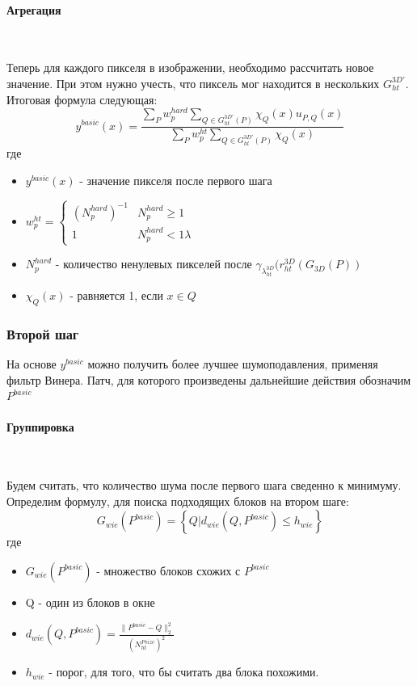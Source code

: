 \paragraph{Агрегация}\

Теперь для каждого пикселя в изображении, необходимо рассчитать новое значение. При этом нужно учесть, что пиксель мог находится в нескольких $G_{ht}^{3D'}$. Итоговая формула следующая:
\begin{equation}
	y^{basic}(x) = \frac{\sum\limits_Pw_p^{hard}\sum\limits_{Q \in G_{ht}^{3D'}(P)}\chi_Q(x)u_{P,Q}(x)}{\sum\limits_Pw_p^{ht}\sum\limits_{Q \in G_{ht}^{3D'}(P)}\chi_Q(x)}
\end{equation}
где
\begin{itemize}
	\item $y^{basic}(x)$ - значение пикселя после первого шага 
	\item $w_p^{ht}  = \begin{cases}(N_p^{hard})^{-1} & N_p^{hard} \geq 1\\ 1 & N_p^{hard} < 1 \lambda\end{cases}$
	\item $N_p^{hard}$ - количество ненулевых пикселей после $\gamma_{\lambda_{ht}^{3D}}(r_{ht}^{3D}(G_{3D}(P))$
	\item $\chi_Q(x)$ - равняется 1, если $x\in Q$
\end{itemize}

\subsubsection{Второй шаг}
На основе $y^{basic}$ можно получить более лучшее шумоподавления, применяя фильтр Винера. Патч, для которого произведены дальнейшие действия обозначим $P^{basic}$
\paragraph{Группировка}\

Будем считать, что количество шума после первого шага сведенно к минимуму. Определим формулу, для поиска подходящих блоков на втором шаге:
\begin{equation}
	G_{wie}(P^{basic}) = \left\{Q | d_{wie}(Q,P^{basic}) \leq h_{wie}\right\}
\end{equation}
где
\begin{itemize}
	\item $G_{wie}(P^{basic})$ - множество блоков схожих с $P^{basic}$
	\item Q - один из блоков в окне
	\item $d_{wie}(Q,P^{basic}) = \frac{\parallel P^{basic} - Q\parallel_2^2}{(N_{ht}^{Psize})^2}$
	\item $h_{wie}$ - порог, для того, что бы считать два блока похожими.
\end{itemize}


